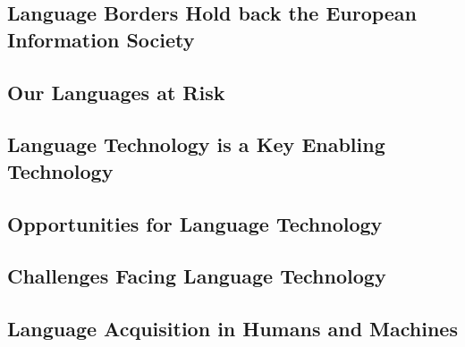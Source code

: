 \documentclass[]{../metanetpaper}
\begin{document}
\begin{multicols}{2}

\subsection{Language Borders Hold back the European Information Society}

\subsection{Our Languages at Risk}

\subsection{Language Technology is a Key Enabling Technology}

\subsection{Opportunities for Language Technology}

\subsection{Challenges Facing Language Technology}

\subsection{Language Acquisition in Humans and Machines}

\end{multicols}

\clearpage
\end{document}
